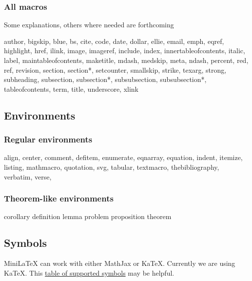 \subsubsection{All macros}

Some explanations, others where needed are forthcoming

\begin{indent}
author,
bigskip,
blue,
bs,
cite,
code,
date,
dollar,
ellie,
email,
emph,
eqref,
highlight,
href,
ilink,
image,
imageref,
include,
index,
innertableofcontents,
italic,
label,
maintableofcontents,
maketitle,
mdash,
medskip,
meta,
ndash,
percent,
red,
ref,
revision,
section,
section*,
setcounter,
smallskip,
strike,
texarg,
strong,
subheading,
subsection,
subsection*,
subsubsection,
subsubsection*,
tableofcontents,
term,
title,
underscore,
xlink
\end{indent}

\subsection{Environments}

\subsubsection{Regular environments}

\begin{indent}
align,
center,
comment,
defitem,
enumerate,
eqnarray,
equation,
indent,
itemize,
listing,
mathmacro,
quotation,
svg,
tabular,
textmacro,
thebibliography,
verbatim,
verse,
\end{indent}

\subsubsection{Theorem-like environments}

\begin{indent}
corollary
definition
lemma
problem
proposition
theorem
\end{indent}



\subsection{Symbols}

MiniLaTeX can work with either MathJax or KaTeX.  Currently we are using KaTeX.  This
\href{https://katex.org/docs/support_table.html}{table of supported symbols} may be helpful.

